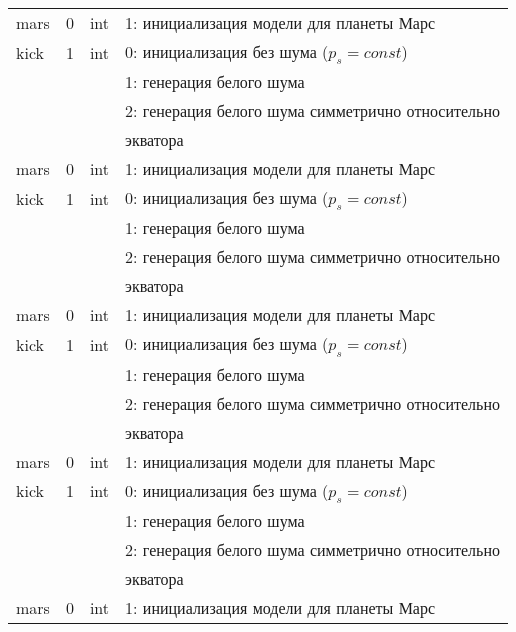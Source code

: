 \begin{longtable}[c]{|l|c|l|l|}
    mars     & 0      & int & 1: инициализация модели для планеты Марс          \\
    kick     & 1      & int & 0: инициализация без шума (\(p_s = const\))       \\
             &        &     & 1: генерация белого шума                          \\
             &        &     & 2: генерация белого шума симметрично относительно \\
             &        &     & экватора                                          \\
    mars     & 0      & int & 1: инициализация модели для планеты Марс          \\
    kick     & 1      & int & 0: инициализация без шума (\(p_s = const\))       \\
             &        &     & 1: генерация белого шума                          \\
             &        &     & 2: генерация белого шума симметрично относительно \\
             &        &     & экватора                                          \\
    mars     & 0      & int & 1: инициализация модели для планеты Марс          \\
    kick     & 1      & int & 0: инициализация без шума (\(p_s = const\))       \\
             &        &     & 1: генерация белого шума                          \\
             &        &     & 2: генерация белого шума симметрично относительно \\
             &        &     & экватора                                          \\
    mars     & 0      & int & 1: инициализация модели для планеты Марс          \\
    kick     & 1      & int & 0: инициализация без шума (\(p_s = const\))       \\
             &        &     & 1: генерация белого шума                          \\
             &        &     & 2: генерация белого шума симметрично относительно \\
             &        &     & экватора                                          \\
    mars     & 0      & int & 1: инициализация модели для планеты Марс          \\
\end{longtable}
\normalsize%
\endgroup

